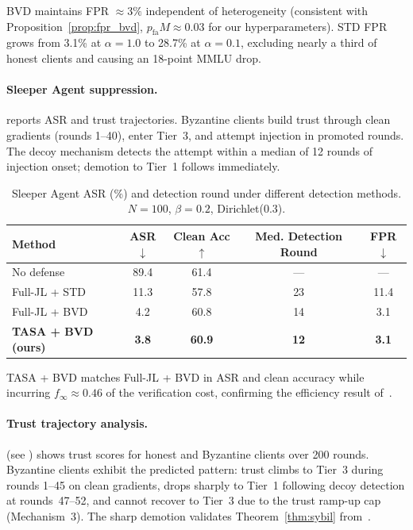 \documentclass{article}
\newcommand{\finf}{f_{\infty}}
\begin{document}
BVD maintains FPR $\approx 3\%$ independent of heterogeneity (consistent
with Proposition~\ref{prop:fpr_bvd}, $p_{\mathrm{fa}} M \approx 0.03$ for
our hyperparameters).
STD FPR grows from 3.1\% at $\alpha=1.0$ to 28.7\% at $\alpha=0.1$,
excluding nearly a third of honest clients and causing an 18-point MMLU drop.

\paragraph{Sleeper Agent suppression.}
 reports ASR and trust trajectories.
Byzantine clients build trust through clean gradients (rounds 1--40),
enter Tier~3, and attempt injection in promoted rounds.
The decoy mechanism detects the attempt within a median of 12 rounds of
injection onset; demotion to Tier~1 follows immediately.

\begin{table}[h]
\centering
\caption{Sleeper Agent ASR (\%) and detection round under different detection
  methods. $N=100$, $\beta=0.2$, Dirichlet($0.3$).}
\label{tab:sleeper}
\small
\begin{tabular}{lcccc}
\toprule
Method & ASR$\downarrow$ & Clean Acc$\uparrow$ & Med. Detection Round & FPR$\downarrow$ \\
\midrule
No defense                & 89.4 & 61.4 & --- & --- \\
Full-JL + STD             & 11.3 & 57.8 & 23  & 11.4 \\
Full-JL + BVD             & 4.2  & 60.8 & 14  & 3.1  \\
\textbf{TASA + BVD (ours)}& \textbf{3.8} & \textbf{60.9} & \textbf{12} & \textbf{3.1} \\
\bottomrule
\end{tabular}
\end{table}

TASA + BVD matches Full-JL + BVD in ASR and clean accuracy while incurring
$\finf \approx 0.46$ of the verification cost, confirming the efficiency
result of~\citet{paper1}.

\paragraph{Trust trajectory analysis.}
 (see ) shows trust scores for
honest and Byzantine clients over 200 rounds.
Byzantine clients exhibit the predicted pattern: trust climbs to Tier~3
during rounds 1--45 on clean gradients, drops sharply to Tier~1 following
decoy detection at rounds~47--52, and cannot recover to Tier~3 due to the
trust ramp-up cap (Mechanism~3).
The sharp demotion validates Theorem~\ref{thm:sybil} from~\citet{paper1}.
\end{document}
